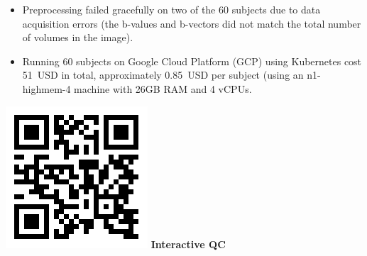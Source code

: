 \documentclass[a0paper,portrait,fontscale=0.395]{baposter}
\begin{document}
\begin{poster}
{\begin{minipage}[c]{0.6\linewidth}
\begin{itemize}[noitemsep]
    \item Preprocessing failed gracefully on two of the 60 subjects due to data acquisition errors (the b-values and b-vectors did not match the total number of volumes in the image).
    \item Running 60 subjects on Google Cloud Platform (GCP) using Kubernetes cost 51~USD in total, approximately 0.85~USD per subject (using an n1-highmem-4 machine with 26GB RAM and 4 vCPUs.
\end{itemize}
\end{minipage}
\begin{minipage}[c]{0.4\linewidth}
    \centering
    \null\hfill
    \begin{minipage}[t]{0.285\linewidth}
    \centering
    \includegraphics[height=\linewidth, valign=c]{dmriprep_qc_dynamic_qr.png}
    \textbf{Interactive QC}
    \end{minipage}
    \hfill
    \begin{minipage}[t]{0.285\linewidth}
    \centering

\end{minipage}
\end{minipage}}
\end{poster}
\end{document}
